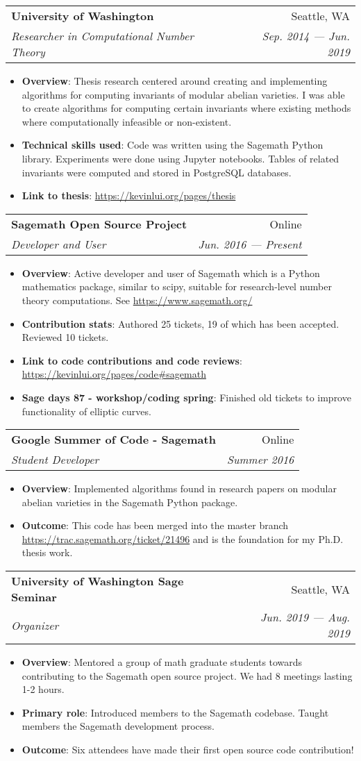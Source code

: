 \documentclass[letterpaper,10pt]{article}
\makeatletter
\newcommand{\resumeItem}[2]{
  \item\small{
    \textbf{#1}{: #2 \vspace{-2pt}}
  }
}
\newcommand{\resumeSubheading}[4]{
  \vspace{-1pt}\item
    \begin{tabular*}{0.97\textwidth}[t]{l@{\extracolsep{\fill}}r}
      \textbf{#1} & #2 \\
      \textit{\small#3} & \textit{\small #4} \\
    \end{tabular*}\vspace{-5pt}
}
\newcommand{\resumeItemListStart}{\begin{itemize}}
\newcommand{\resumeItemListEnd}{\end{itemize}\vspace{-5pt}}
\makeatother
\begin{document}
\resumeSubheading
{University of Washington}{Seattle, WA}
{Researcher in Computational Number Theory}{Sep. 2014 --- Jun. 2019}
\resumeItemListStart
\resumeItem{Overview}
{
    Thesis research centered around creating and implementing algorithms for
    computing invariants of modular abelian varieties. I was able to create
    algorithms for computing certain invariants where existing methods where
    computationally infeasible or non-existent.
}
\resumeItem{Technical skills used}{
    Code was written using the Sagemath Python library. Experiments were done
    using Jupyter notebooks. Tables of related invariants were computed and
    stored in PostgreSQL databases.
}
\resumeItem{Link to thesis}{\url{https://kevinlui.org/pages/thesis}}
\resumeItemListEnd

\resumeSubheading
{Sagemath Open Source Project}{Online}
{Developer and User}{Jun. 2016 --- Present}
\resumeItemListStart
\resumeItem{Overview}
{Active developer and user of Sagemath which is a Python mathematics
package, similar to scipy, suitable for research-level number theory
computations. See \url{https://www.sagemath.org/}}
\resumeItem{Contribution stats}{Authored 25 tickets, 19 of which has been
accepted. Reviewed 10 tickets.}
\resumeItem{Link to
code contributions and code reviews}{\url{https://kevinlui.org/pages/code\#sagemath}}
\resumeItem{Sage days 87 - workshop/coding spring}{Finished old tickets to
improve functionality of elliptic curves.}
\resumeItemListEnd

\resumeSubheading
{Google Summer of Code - Sagemath}{Online}
{Student Developer}{Summer 2016}
\resumeItemListStart
\resumeItem{Overview}
{Implemented algorithms found in research papers on modular abelian varieties
in the Sagemath Python package.} 
\resumeItem{Outcome}{This code has been merged into the master branch
\url{https://trac.sagemath.org/ticket/21496} and is the foundation for my Ph.D.
thesis work.}
\resumeItemListEnd


\resumeSubheading
{University of Washington Sage Seminar}{Seattle, WA}
{Organizer}{Jun. 2019 --- Aug. 2019}
\resumeItemListStart
\resumeItem{Overview}{Mentored a group of math graduate students towards
contributing to the Sagemath open source project. We had 8 meetings lasting
1-2 hours.}
\resumeItem{Primary role}{Introduced members to the Sagemath codebase. Taught
members the Sagemath development process.}
\resumeItem{Outcome}{Six attendees have made their first open source code
contribution!}
\resumeItemListEnd

\end{document}
